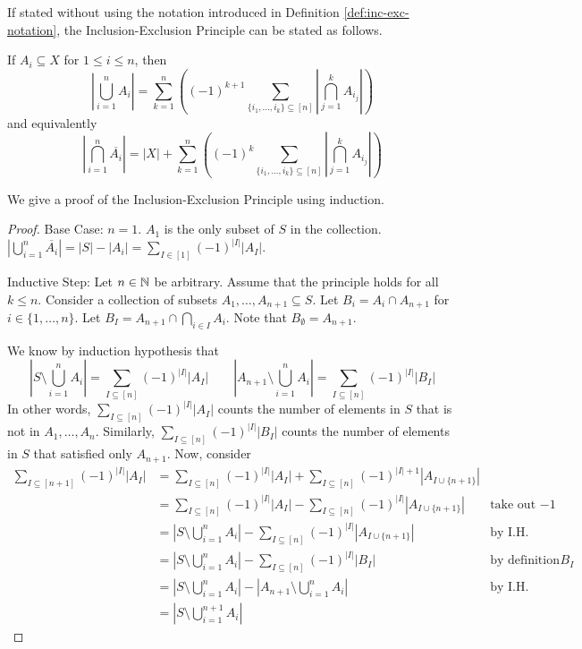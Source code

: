 If stated without using the notation introduced in Definition \ref{def:inc-exc-notation}, the Inclusion-Exclusion Principle can be stated as follows.

\begin{theorem}
    If $A_i \subseteq X$ for $1 \leq i \leq n$, then
    $$
    \left| \bigcup_{i=1}^n A_i \right| = \sum_{k=1}^n \left( (-1)^{k+1} \sum_{\{i_1,\ldots,i_k\} \subseteq [n]} \left| \bigcap_{j=1}^k A_{i_j} \right| \right)
    $$
    and equivalently
    $$
    \left| \bigcap_{i=1}^n \overline{A_i} \right| = |X| + \sum_{k=1}^n \left( (-1)^{k} \sum_{\{i_1,\ldots,i_k\} \subseteq [n]} \left| \bigcap_{j=1}^k A_{i_j} \right| \right)
    $$
\end{theorem}

We give a proof of the Inclusion-Exclusion Principle using induction.

\begin{proof}
    \hfill

    Base Case: $n = 1$. $A_1$ is the only subset of $S$ in the collection. $| \bigcup_{i=1}^n \overline{A_i}| = |S| - |A_i| = \sum_{I \in [1]} (-1)^{|I|} |A_I|$.

    Inductive Step: Let $n \in \mathbb{N}$ be arbitrary. Assume that the principle holds for all $k \leq n$. Consider a collection of subsets $A_1,\ldots,A_{n+1} \subseteq S$. Let $B_i = A_i \cap A_{n+1}$ for $i \in \{1,\ldots,n\}$. Let $B_I = A_{n+1} \cap \bigcap_{i \in I}A_i$. Note that $B_{\emptyset} = A_{n+1}$.

    We know by induction hypothesis that
    $$
    \left| S \setminus \bigcup_{i=1}^n A_i \right| = \sum_{I \subseteq [n]} (-1)^{|I|} |A_I| \qquad \left| A_{n+1} \setminus \bigcup_{i=1}^n A_i \right| = \sum_{I \subseteq [n]} (-1)^{|I|} |B_I|
    $$
    In other words, $\sum_{I \subseteq [n]} (-1)^{|I|} |A_I|$ counts the number of elements in $S$ that is not in $A_1,\ldots,A_n$. Similarly, $\sum_{I \subseteq [n]} (-1)^{|I|} |B_I|$ counts the number of elements in $S$ that satisfied only $A_{n+1}$. Now, consider
    $$
    \begin{aligned}
        \sum_{I \subseteq [n+1]} (-1)^{|I|} |A_I| &= \sum_{I \subseteq [n]} (-1)^{|I|} |A_I| + \sum_{I \subseteq [n]} (-1)^{|I| + 1} |A_{I \cup \{n+1\}}| \\
        &= \sum_{I \subseteq [n]} (-1)^{|I|} |A_I| - \sum_{I \subseteq [n]} (-1)^{|I|} |A_{I \cup \{n+1\}}| & \text{take out $-1$} \\
        &= \left| S \setminus \bigcup_{i=1}^n A_i \right| - \sum_{I \subseteq [n]} (-1)^{|I|} |A_{I \cup \{n+1\}}| & \text{by I.H.} \\
        &= \left| S \setminus \bigcup_{i=1}^n A_i \right| - \sum_{I \subseteq [n]} (-1)^{|I|} |B_I| & \text{by definition of $B_I$} \\
        &= \left| S \setminus \bigcup_{i=1}^n A_i \right| - \left| A_{n+1} \setminus \bigcup_{i=1}^n A_i \right| & \text{by I.H.} \\
        &= \left| S \setminus \bigcup_{i=1}^{n+1} A_i \right|
    \end{aligned}
    $$
\end{proof}

